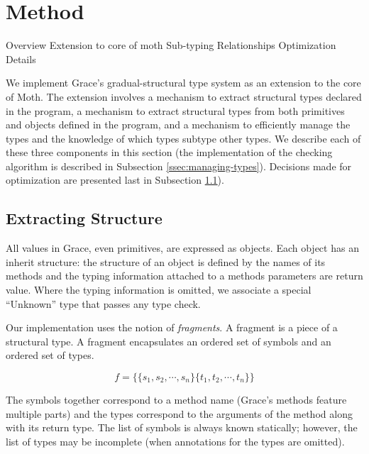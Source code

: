 \section{Method}
\label{sec:method}

\begin{outline}

\1 Overview
\1 Extension to core of moth
\1 Sub-typing Relationships
\1 Optimization Details

\end{outline}


We implement Grace's gradual-structural type system as an extension to the core of Moth. The extension involves a mechanism to extract structural types declared in the program, a mechanism to extract structural types from both primitives and objects defined in the program, and a mechanism to efficiently manage the types and the knowledge of which types subtype other types. We describe each of these three components in this section (the implementation of the checking algorithm is described in Subsection \ref{ssec:managing-types}). Decisions made for optimization are presented last in Subsection \ref{ssec:optimization-details}). 

\subsection{Extracting Structure}
\label{ssec:optimization-details}

All values in Grace, even primitives, are expressed as objects. Each object has an inherit structure: the structure of an object is defined by the names of its methods and the typing information attached to a methods parameters are return value. Where the typing information is omitted, we associate a special ``Unknown'' type that passes any type check.

Our implementation uses the notion of \emph{fragments}. A fragment is a piece of a structural type. A fragment encapsulates an ordered set of symbols and an ordered set of types.

\begin{equation}
f = \{   \{ s_1, s_2, \cdots, s_n \}   \{ t_1, t_2, \cdots, t_n \}  \}
\end{equation}

The symbols together correspond to a method name (Grace's methods feature multiple parts) and the types correspond to the arguments of the method along with its return type. The list of symbols is always known statically; however, the list of types may be incomplete (when annotations for the types are omitted).

